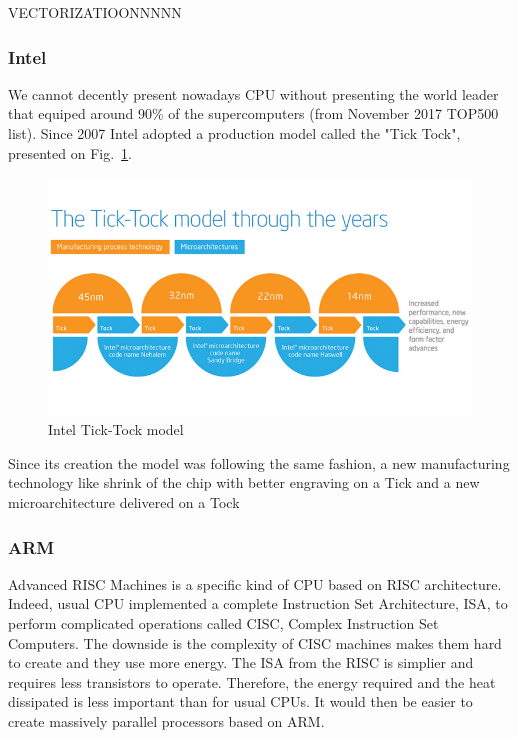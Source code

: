 VECTORIZATIOONNNNN

\subsubsection{Intel}

We cannot decently present nowadays CPU without presenting the world leader that equiped around 90\% of the supercomputers (from November 2017 TOP500 list). 
Since 2007 Intel adopted a production model called the "Tick Tock", presented on Fig.~\ref{fig:1_HPC:intel_tick_tock}.

\begin{figure}
\includegraphics[width=\textwidth]{figures/chap1/intel_tick_tock.png}
\caption{Intel Tick-Tock model}
\label{fig:1_HPC:intel_tick_tock}
\end{figure}

Since its creation the model was following the same fashion, a new manufacturing technology like shrink of the chip with better engraving on a Tick and a new microarchitecture delivered on a Tock

\subsubsection{ARM}
Advanced RISC Machines is a specific kind of CPU based on RISC architecture. 
Indeed, usual CPU implemented a complete Instruction Set Architecture, ISA, to perform complicated operations called CISC, Complex Instruction Set Computers. 
The downside is the complexity of CISC machines makes them hard to create and they use more energy. 
The ISA from the RISC is simplier and requires less transistors to operate. 
Therefore, the energy required and the heat dissipated is less important than for usual CPUs. 
It would then be easier to create massively parallel processors based on ARM. 

